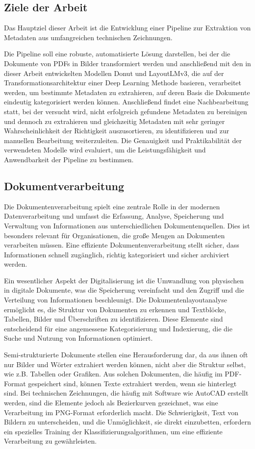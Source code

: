 \documentclass[12pt,a4paper,twoside]{article}
\begin{document}
\subsection{Ziele der Arbeit}
Das Hauptziel dieser Arbeit ist die Entwicklung einer Pipeline zur Extraktion von Metadaten aus umfangreichen technischen Zeichnungen.

Die Pipeline soll eine robuste, automatisierte Lösung darstellen, bei der die Dokumente von PDFs in Bilder transformiert werden und anschließend mit den in dieser Arbeit entwickelten Modellen Donut und LayoutLMv3, die auf der Transformationsarchitektur einer Deep Learning Methode basieren, verarbeitet werden, um bestimmte Metadaten zu extrahieren, auf deren Basis die Dokumente eindeutig kategorisiert werden können. Anschließend findet eine Nachbearbeitung statt, bei der versucht wird, nicht erfolgreich gefundene Metadaten zu bereinigen und dennoch zu extrahieren und gleichzeitig Metadaten mit sehr geringer Wahrscheinlichkeit der Richtigkeit auszusortieren, zu identifizieren und zur manuellen Bearbeitung weiterzuleiten. Die Genauigkeit und Praktikabilität der verwendeten Modelle wird evaluiert, um die Leistungsfähigkeit und Anwendbarkeit der Pipeline zu bestimmen.

\subsection{Dokumentverarbeitung}
Die Dokumentenverarbeitung spielt eine zentrale Rolle in der modernen Datenverarbeitung und umfasst die Erfassung, Analyse, Speicherung und Verwaltung von Informationen aus unterschiedlichen Dokumentenquellen. Dies ist besonders relevant für Organisationen, die große Mengen an Dokumenten verarbeiten müssen. Eine effiziente Dokumentenverarbeitung stellt sicher, dass Informationen schnell zugänglich, richtig kategorisiert und sicher archiviert werden.

Ein wesentlicher Aspekt der Digitalisierung ist die Umwandlung von physischen in digitale Dokumente, was die Speicherung vereinfacht und den Zugriff und die Verteilung von Informationen beschleunigt. Die Dokumentenlayoutanalyse ermöglicht es, die Struktur von Dokumenten zu erkennen und Textblöcke, Tabellen, Bilder und Überschriften zu identifizieren. Diese Elemente sind entscheidend für eine angemessene Kategorisierung und Indexierung, die die Suche und Nutzung von Informationen optimiert.

Semi-strukturierte Dokumente stellen eine Herausforderung dar, da aus ihnen oft nur Bilder und Wörter extrahiert werden können, nicht aber die Struktur selbst, wie z.B. Tabellen oder Grafiken. Aus solchen Dokumenten, die häufig im PDF-Format gespeichert sind, können Texte extrahiert werden, wenn sie hinterlegt sind. Bei technischen Zeichnungen, die häufig mit Software wie AutoCAD erstellt werden, sind die Elemente jedoch als Bezierkurven gezeichnet, was eine Verarbeitung im PNG-Format erforderlich macht. Die Schwierigkeit, Text von Bildern zu unterscheiden, und die Unmöglichkeit, sie direkt einzubetten, erfordern ein spezielles Training der Klassifizierungsalgorithmen, um eine effiziente Verarbeitung zu gewährleisten.
\end{document}
